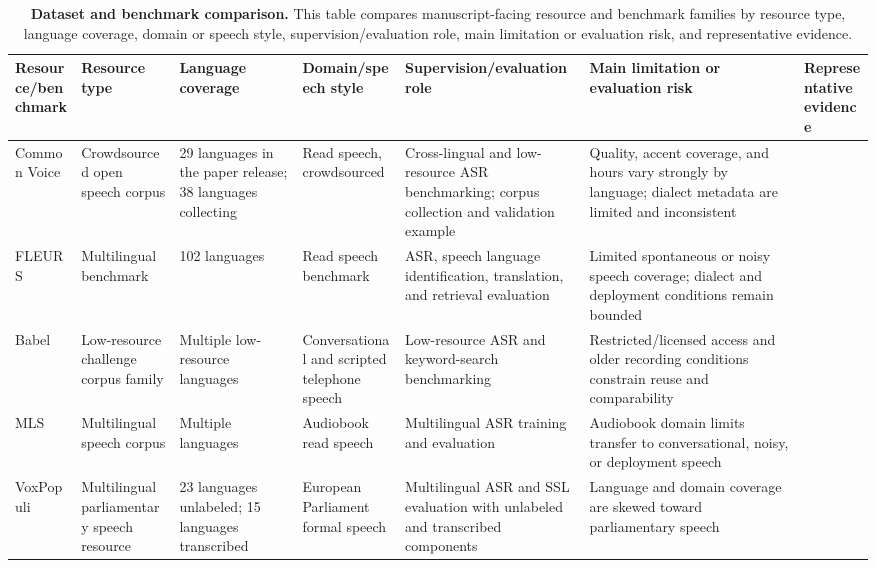 \documentclass[pdflatex,sn-basic,iicol]{sn-jnl}
\theoremstyle{thmstyleone}
\theoremstyle{thmstyletwo}
\theoremstyle{thmstylethree}
\begin{document}
\begin{table}[htbp]
\setcounter{table}{1}
\footnotesize
\centering
\caption{\textbf{Dataset and benchmark comparison.} This table compares manuscript-facing resource and benchmark families by resource type, language coverage, domain or speech style, supervision/evaluation role, main limitation or evaluation risk, and representative evidence.}
\label{tab:2}
\begin{tabularx}{\textwidth}{YYYYYYY}
\toprule
\textbf{Resource/benchmark} & \textbf{Resource type} & \textbf{Language coverage} & \textbf{Domain/speech style} & \textbf{Supervision/evaluation role} & \textbf{Main limitation or evaluation risk} & \textbf{Representative evidence} \\
\midrule
Common Voice & Crowdsourced open speech corpus & 29 languages in the paper release; 38 languages collecting & Read speech, crowdsourced & Cross-lingual and low-resource ASR benchmarking; corpus collection and validation example & Quality, accent coverage, and hours vary strongly by language; dialect metadata are limited and inconsistent & \citep{ardila2020commonvoice} \\
FLEURS & Multilingual benchmark & 102 languages & Read speech benchmark & ASR, speech language identification, translation, and retrieval evaluation & Limited spontaneous or noisy speech coverage; dialect and deployment conditions remain bounded & \citep{conneau2022fleurs} \\
Babel & Low-resource challenge corpus family & Multiple low-resource languages & Conversational and scripted telephone speech & Low-resource ASR and keyword-search benchmarking & Restricted/licensed access and older recording conditions constrain reuse and comparability & \citep{gales2014_babel_project_research_cued,peterson2022_openasr21} \\
MLS & Multilingual speech corpus & Multiple languages & Audiobook read speech & Multilingual ASR training and evaluation & Audiobook domain limits transfer to conversational, noisy, or deployment speech & \citep{pratap20_interspeech} \\
VoxPopuli & Multilingual parliamentary speech resource & 23 languages unlabeled; 15 languages transcribed & European Parliament formal speech & Multilingual ASR and SSL evaluation with unlabeled and transcribed components & Language and domain coverage are skewed toward parliamentary speech & \citep{wang2021voxpopuli} \\

\end{tabularx}
\end{table}
\end{document}
